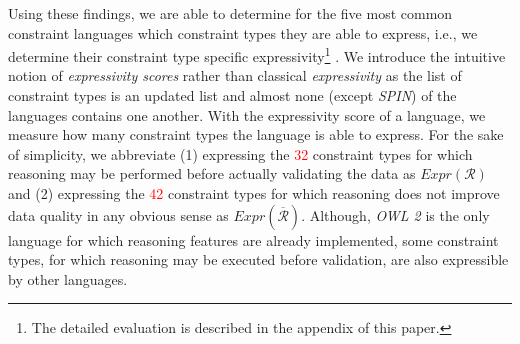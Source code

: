 \documentclass{acm_proc_article-sp}
\newcommand{\ms}[1]{%
  \texttt{#1}
}
\newcommand{\tb}[1]{\todo[size=\small, color=green!40]{\textbf{Thomas:} #1}}
\newcommand{\er}[1]{\todo[size=\small, color=red!40]{\textbf{Erman:} #1}}
\newenvironment{evaluation}{
  \begin{tabular}{l|c|c|c|c|c|c}
  \hline
  \textbf{Constraint Class} & \textbf{DSP} & \textbf{OWL2-DL} & \textbf{OWL2-QL} & \textbf{ReSh} & \textbf{ShEx} & \textbf{SPIN} \\
  \hline

}{
  \hline
  \end{tabular}
  \linebreak
}
\begin{document}
Using these findings, we are able to determine for the five most common constraint languages which constraint types they are able to express, i.e., we determine their constraint type specific expressivity\footnote{The detailed evaluation is described in the appendix of this paper.} \cite{BoschNolleAcarEckert2015}.
We introduce the intuitive notion of \emph{expressivity scores} rather than classical \emph{expressivity}
as the list of constraint types is an updated list and almost none (except \emph{SPIN}) of the languages contains one another.
With the expressivity score of a language, we measure how many constraint types the language is able to express. 
For the sake of simplicity, we abbreviate 
(1) expressing the \textcolor{red}{32} constraint types for which reasoning may be performed before actually validating the data as $Expr(\mathcal{R})$ and 
(2) expressing the \textcolor{red}{42} constraint types for which reasoning does not improve data quality in any obvious sense as $Expr(\overline{\mathcal{R}})$.
Although, \emph{OWL 2} is the only language for which reasoning features are already implemented, 
some constraint types, for which reasoning may be executed before validation, are also expressible by other languages. 
\end{document}
